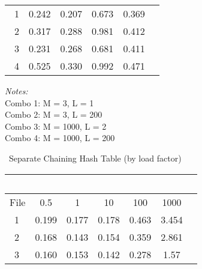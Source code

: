 \documentclass[8]{report}
\begin{document}
\begin{table}[ht]
\begin{threeparttable}
\begin{tabular}{l*{5}{c}}
\    1  &     0.242  &   0.207   &   0.673  &  0.369   \\
                       

\       2&      0.317  &   0.288 &   0.981  &   0.412              \\
                  
\       3&     0.231   &  0.268  &  0.681  &  0.411         \\
     
 \       4  &   0.525  &    0.330  &   0.992 & 0.471             \\
 

\hline 

\end{tabular}

\begin{tablenotes} 
\setlength{}
\footnotesize
\item \textit{Notes:} \\
 Combo 1: M = 3, L = 1 \\
 Combo 2: M = 3, L = 200 \\
  Combo 3: M = 1000, L = 2 \\
 Combo 4: M = 1000, L = 200 \\



\end{tablenotes}

\ Separate Chaining Hash Table (by load factor) \\
\begin{tabular}{l*{6}{c}}
\   &\multicolumn{1}{c}{}  &\multicolumn{1}{c}{}   &\multicolumn{1}{c}{} &\multicolumn{1}{c}{}  &\multicolumn{1}{c}{}   \\
\hline\hline


     \multicolumn{1}{c}{File }  &\multicolumn{1}{c}{0.5}   &\multicolumn{1}{c}{1} &\multicolumn{1}{c}{10}  &\multicolumn{1}{c}{100} &\multicolumn{1}{c}{1000}   \\


\hline


\    1  &     0.199  &   0.177   &   0.178  &  0.463   &  3.454   \\
                       

\       2&      0.168 &   0.143 &   0.154  &   0.359  &  2.861             \\
                  
\       3&     0.160   &  0.153  &  0.142  &  0.278   & 1.57       \\
     

\end{tabular}
\end{threeparttable}
\end{table}
\end{document}
